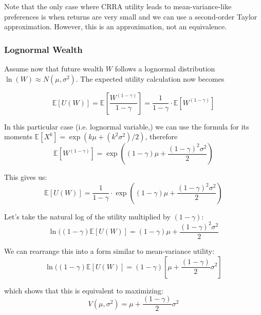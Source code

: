 Note that the only case where CRRA utility leads to mean-variance-like preferences is when returns are very small and we can use a second-order Taylor approximation. However, this is an approximation, not an equivalence.

\subsubsection{Lognormal Wealth}

Assume now that future wealth $W$ follows a lognormal distribution $\ln(W)\approx N(\mu,\sigma^2)$. The expected utility calculation now becomes


\begin{equation*}
\mathbb{E}[U(W)] = \mathbb{E}\left[\frac{W^{(1-\gamma)}}{1-\gamma}\right] = \frac{1}{1-\gamma} \cdot \mathbb{E}[W^{(1-\gamma)}]
\end{equation*}

In this particular case (i.e. lognormal variable,) we can use the formula for its moments $\mathbb{E}[X^k]=\exp(k\mu+(k^2\sigma^2)/2)$, therefore
\begin{equation*}
\mathbb{E}[W^{(1-\gamma)}] = \exp\left((1-\gamma)\mu + \frac{(1-\gamma)^2\sigma^2}{2}\right)
\end{equation*}

This gives us:
\begin{equation*}
\mathbb{E}[U(W)] = \frac{1}{1-\gamma} \cdot \exp\left((1-\gamma)\mu + \frac{(1-\gamma)^2\sigma^2}{2}\right)
\end{equation*}

Let's take the natural log of the utility multiplied by $(1-\gamma)$:
\begin{equation*}
\ln((1-\gamma)\mathbb{E}[U(W)] = (1-\gamma)\mu + \frac{(1-\gamma)^2\sigma^2}{2}
\end{equation*}

We can rearrange this into a form similar to mean-variance utility:
\begin{equation*}
\ln((1-\gamma)\mathbb{E}[U(W)] = (1-\gamma)\left[\mu + \frac{(1-\gamma)}{2}\sigma^2\right]
\end{equation*}

which shows that this is equivalent to maximizing:
\begin{equation*}
V(\mu, \sigma^2) = \mu + \frac{(1-\gamma)}{2}\sigma^2
\end{equation*}

